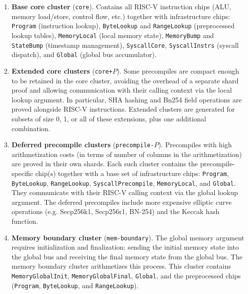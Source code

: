 \documentclass[11pt]{article}
\begin{document}
\begin{enumerate}
\item \textbf{Base core cluster} (\texttt{core}).
Contains all RISC-V instruction chips (ALU, memory load/store, control flow, etc.)
together with infrastructure chips: \texttt{Program} (instruction lookup),
\texttt{ByteLookup} and \texttt{RangeLookup} (preprocessed lookup tables),
\texttt{MemoryLocal} (local memory state),
\texttt{MemoryBump} and \texttt{StateBump} (timestamp management),
\texttt{SyscallCore}, \texttt{SyscallInstrs} (syscall dispatch),
and \texttt{Global} (global bus accumulator).

\item \textbf{Extended core clusters} (\texttt{core+}$P$).
Some precompiles are compact enough to be retained in the core cluster,
avoiding the overhead of a separate shard proof and allowing communication
with their calling context via the local lookup argument.
In particular, SHA hashing and Bn254 field operations are proved alongside RISC-V instructions.
Extended clusters are generated for subsets of size 0, 1, or all of these extensions,
plus one additional combination.

\item \textbf{Deferred precompile clusters} (\texttt{precompile-}$P$).
Precompiles with high arithmetization costs (in terms of number of columns
in the arithmetization) are proved in their own shards. Each such cluster contains
the precompile-specific chip(s) together with a base set of infrastructure chips:
\texttt{Program}, \texttt{ByteLookup}, \texttt{RangeLookup},
\texttt{SyscallPrecompile}, \texttt{MemoryLocal}, and \texttt{Global}.
They communicate with their RISC-V calling context
via the global lookup argument.
The deferred precompiles include more expensive elliptic curve operations (e.g. Secp256k1, Secp256r1, BN-254)
and the Keccak hash function.

\item \textbf{Memory boundary cluster} (\texttt{mem-boundary}).
The global memory argument requires initialization and
finalization: sending the initial memory state into the global bus and receiving the final memory state
from the global bus.
The memory boundary cluster arithmetizes this process.
This cluster contains \texttt{MemoryGlobalInit}, \texttt{MemoryGlobalFinal},
\texttt{Global}, and the preprocessed chips (\texttt{Program}, \texttt{ByteLookup}, and \texttt{RangeLookup}).
\end{enumerate}
\end{document}
